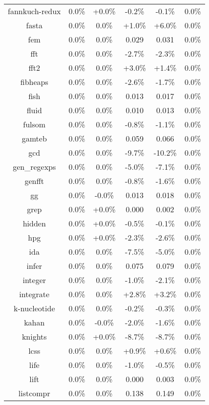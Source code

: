 \begin{tabular}{ c c c c c c }
fannkuch-redux &  0.0\% & +0.0\% & -0.2\% & -0.1\% &  0.0\%\\
fasta &  0.0\% &  0.0\% & +1.0\% & +6.0\% &  0.0\%\\
fem &  0.0\% &  0.0\% & 0.029 & 0.031 &  0.0\%\\
fft &  0.0\% &  0.0\% & -2.7\% & -2.3\% &  0.0\%\\
fft2 &  0.0\% &  0.0\% & +3.0\% & +1.4\% &  0.0\%\\
fibheaps &  0.0\% &  0.0\% & -2.6\% & -1.7\% &  0.0\%\\
fish &  0.0\% &  0.0\% & 0.013 & 0.017 &  0.0\%\\
fluid &  0.0\% &  0.0\% & 0.010 & 0.013 &  0.0\%\\
fulsom &  0.0\% &  0.0\% & -0.8\% & -1.1\% &  0.0\%\\
gamteb &  0.0\% &  0.0\% & 0.059 & 0.066 &  0.0\%\\
gcd &  0.0\% &  0.0\% & -9.7\% & -10.2\% &  0.0\%\\
gen\_regexps &  0.0\% &  0.0\% & -5.0\% & -7.1\% &  0.0\%\\
genfft &  0.0\% &  0.0\% & -0.8\% & -1.6\% &  0.0\%\\
gg &  0.0\% & -0.0\% & 0.013 & 0.018 &  0.0\%\\
grep &  0.0\% & +0.0\% & 0.000 & 0.002 &  0.0\%\\
hidden &  0.0\% & +0.0\% & -0.5\% & -0.1\% &  0.0\%\\
hpg &  0.0\% & +0.0\% & -2.3\% & -2.6\% &  0.0\%\\
ida &  0.0\% &  0.0\% & -7.5\% & -5.0\% &  0.0\%\\
infer &  0.0\% &  0.0\% & 0.075 & 0.079 &  0.0\%\\
integer &  0.0\% &  0.0\% & -1.0\% & -2.1\% &  0.0\%\\
integrate &  0.0\% &  0.0\% & +2.8\% & +3.2\% &  0.0\%\\
k-nucleotide &  0.0\% &  0.0\% & -0.2\% & -0.3\% &  0.0\%\\
kahan &  0.0\% & -0.0\% & -2.0\% & -1.6\% &  0.0\%\\
knights &  0.0\% & +0.0\% & -8.7\% & -8.7\% &  0.0\%\\
lcss &  0.0\% &  0.0\% & +0.9\% & +0.6\% &  0.0\%\\
life &  0.0\% &  0.0\% & -1.0\% & -0.5\% &  0.0\%\\
lift &  0.0\% &  0.0\% & 0.000 & 0.003 &  0.0\%\\
listcompr &  0.0\% &  0.0\% & 0.138 & 0.149 &  0.0\%\\

\end{tabular}

